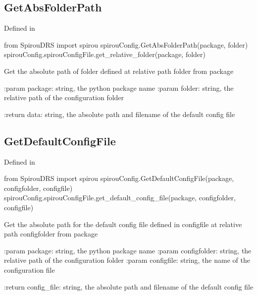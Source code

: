 \begin{minipage}{\textwidth}
\subsection{GetAbsFolderPath}

Defined in \spirouConfig{}

\begin{pythonbox}
from SpirouDRS import spirou
spirouConfig.GetAbsFolderPath(package, folder)
spirouConfig.spirouConfigFile.get_relative_folder(package, folder)
\end{pythonbox}

\begin{pythondocstring}
Get the absolute path of folder defined at relative path
folder from package

:param package: string, the python package name
:param folder: string, the relative path of the configuration folder

:return data: string, the absolute path and filename of the default config
              file
\end{pythondocstring}
\end{minipage}

\begin{minipage}{\textwidth}
\subsection{GetDefaultConfigFile}

Defined in \spirouConfig{}

\begin{pythonbox}
from SpirouDRS import spirou
spirouConfig.GetDefaultConfigFile(package, configfolder, configfile)
spirouConfig.spirouConfigFile.get_default_config_file(package, configfolder, configfile)
\end{pythonbox}

\begin{pythondocstring}
Get the absolute path for the  default config file defined in
configfile at relative path configfolder from package

:param package: string, the python package name
:param configfolder: string, the relative path of the configuration folder
:param configfile: string, the name of the configuration file

:return config_file: string, the absolute path and filename of the
                     default config file
\end{pythondocstring}
\end{minipage}

